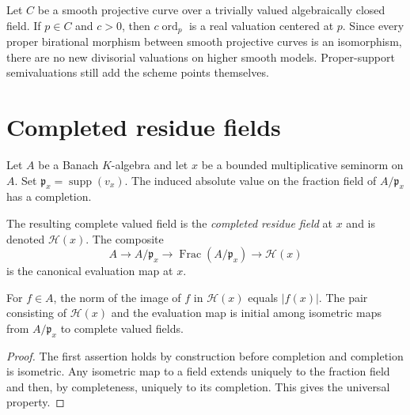 \begin{example}\label{ex:smooth-curve-valuations}
Let $C$ be a smooth projective curve over a trivially valued algebraically
closed field. If $p\in C$ and $c>0$, then
$c\operatorname{ord}_p$ is a real valuation centered at $p$. Since every
proper birational morphism between smooth projective curves is an
isomorphism, there are no new divisorial valuations on higher smooth models.
Proper-support semivaluations still add the scheme points themselves.
\end{example}

\section{Completed residue fields}

Let $A$ be a Banach $K$-algebra and let $x$ be a bounded multiplicative
seminorm on $A$. Set $\mathfrak p_x=\operatorname{supp}(v_x)$. The induced
absolute value on the fraction field of $A/\mathfrak p_x$ has a completion.

\begin{definition}\label{def:completed-residue-field}
The resulting complete valued field is the \emph{completed residue field} at
$x$ and is denoted $\mathcal H(x)$. The composite
\[
                    A\longrightarrow A/\mathfrak p_x
       \longrightarrow\operatorname{Frac}(A/\mathfrak p_x)
       \longrightarrow\mathcal H(x)
\]
is the canonical evaluation map at $x$.
\end{definition}

\begin{proposition}
\label{prop:completed-residue-universal}
For $f\in A$, the norm of the image of $f$ in $\mathcal H(x)$ equals
$|f(x)|$. The pair consisting of $\mathcal H(x)$ and the evaluation map is
initial among isometric maps from $A/\mathfrak p_x$ to complete valued fields.
\end{proposition}
\begin{proof}
The first assertion holds by construction before completion and completion
is isometric. Any isometric map to a field extends uniquely to the fraction
field and then, by completeness, uniquely to its completion. This gives the
universal property.
\end{proof}

